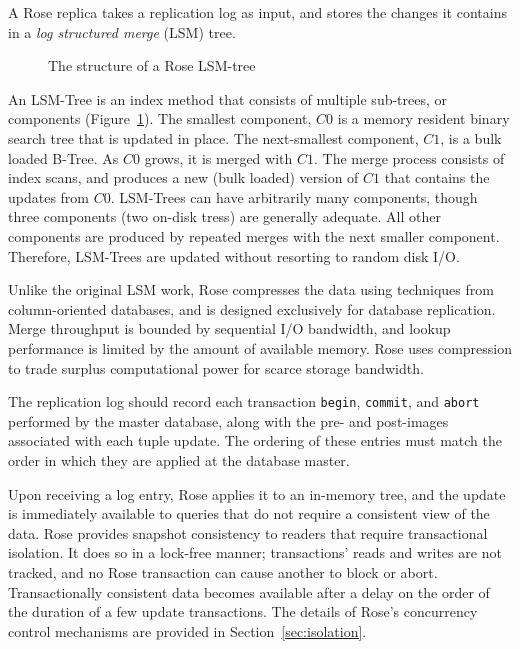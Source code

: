 \documentclass{vldb}
\newcommand{\rows}{Rose\xspace}
\newcommand{\rowss}{Rose's\xspace}
\begin{document}
A \rows replica takes a replication log as input, and stores the
changes it contains in a {\em log structured merge} (LSM)
tree\cite{lsm}.
\begin{figure}
\centering {}
\caption{The structure of a \rows LSM-tree}
\label{fig:lsm-tree}
\end{figure}
An LSM-Tree is an index method that consists of multiple sub-trees, or
components (Figure~\ref{fig:lsm-tree}).  The smallest component, $C0$ is a memory resident
binary search tree that is updated in place.  The next-smallest component, $C1$, is a bulk
loaded B-Tree.  As $C0$ grows,
it is merged with $C1$.  The merge process consists of index scans,
and produces a new (bulk loaded) version of $C1$ that contains the
updates from $C0$.  LSM-Trees can have arbitrarily many components,
though three components (two on-disk tress) are generally adequate.
All other
components are produced by repeated merges with the next smaller
component.  Therefore, LSM-Trees are updated without resorting to
random disk I/O.

Unlike the original LSM work, \rows compresses the data using
techniques from column-oriented databases, and is designed exclusively
for database replication.  Merge throughput is bounded by sequential
I/O bandwidth, and lookup performance is limited by the amount of
available memory.  \rows uses compression to trade surplus
computational power for scarce storage bandwidth.

The replication log should record each transaction {\tt begin}, {\tt commit}, and
{\tt abort} performed by the master database, along with the pre- and
post-images associated with each tuple update.  The ordering of these
entries must match the order in which they are applied at the
database master.

Upon receiving a log entry, \rows applies it to an in-memory tree, and
the update is immediately available to queries that do not require a
consistent view of the data.  \rows provides snapshot consistency to
readers that require transactional isolation.  It does so in a
lock-free manner; transactions' reads and writes are not tracked, and
no \rows transaction can cause another to block or abort.  
Transactionally consistent data becomes available after
a delay on the order of the duration of a few update transactions.
The details of \rowss concurrency control mechanisms are provided in
Section~\ref{sec:isolation}.
\end{document}
